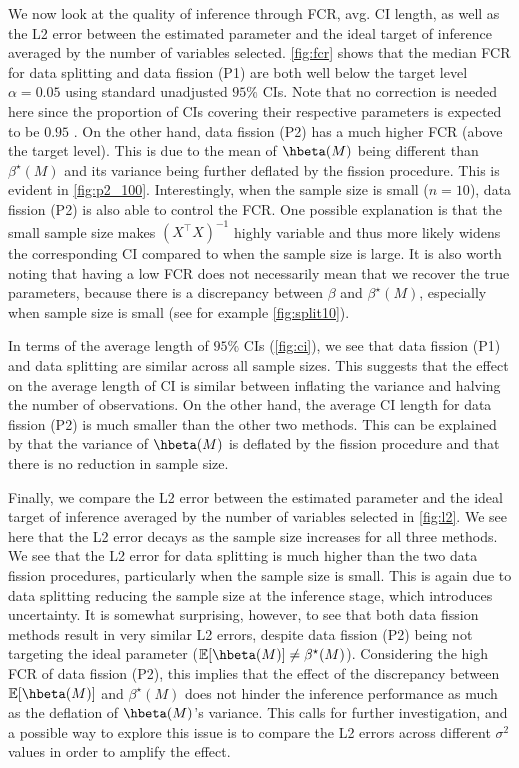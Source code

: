 We now look at the quality of inference through FCR, avg. CI length, as well as the L2 error between the estimated parameter and the ideal target of inference averaged by the number of variables selected. \cref{fig:fcr} shows that the median FCR for data splitting and data fission (P1) are both well below the target level $\alpha = 0.05$ using standard unadjusted $95\%$ CIs. Note that no correction is needed here since the proportion of CIs covering their respective parameters is expected to be $0.95$ \citep{benjamini2005false}. On the other hand, data fission (P2) has a much higher FCR (above the target level). This is due to the mean of $\hbeta(M)$ being different than $\beta^\star(M)$ and its variance being further deflated by the fission procedure. This is evident in \cref{fig:p2_100}. Interestingly, when the sample size is small ($n=10$), data fission (P2) is also able to control the FCR. One possible explanation is that the small sample size makes $(X^\top X)^{-1}$ highly variable and thus more likely widens the corresponding CI compared to when the sample size is large. It is also worth noting that having a low FCR does not necessarily mean that we recover the true parameters, because there is a discrepancy between $\beta$ and $\beta^\star(M)$, especially when sample size is small (see for example \cref{fig:split10}).

In terms of the average length of $95\%$ CIs (\cref{fig:ci}), we see that data fission (P1) and data splitting are similar across all sample sizes. This suggests that the effect on the average length of CI is similar between inflating the variance and halving the number of observations. On the other hand, the average CI length for data fission (P2) is much smaller than the other two methods. This can be explained by that the variance of $\hbeta(M)$ is deflated by the fission procedure and that there is no reduction in sample size.

Finally, we compare the L2 error between the estimated parameter and the ideal target of inference averaged by the number of variables selected in \cref{fig:l2}. We see here that the L2 error decays as the sample size increases for all three methods. We see that the L2 error for data splitting is much higher than the two data fission procedures, particularly when the sample size is small. This is again due to data splitting reducing the sample size at the inference stage, which introduces uncertainty. It is somewhat surprising, however, to see that both data fission methods result in very similar L2 errors, despite data fission (P2) being not targeting the ideal parameter ($\EE[\hbeta(M)] \neq \beta^\star(M)$). Considering the high FCR of data fission (P2), this implies that the effect of the discrepancy between $\EE[\hbeta(M)]$ and $\beta^\star(M)$ does not hinder the inference performance as much as the deflation of $\hbeta(M)$'s variance. This calls for further investigation, and a possible way to explore this issue is to compare the L2 errors across different $\sigma^2$ values in order to amplify the effect.